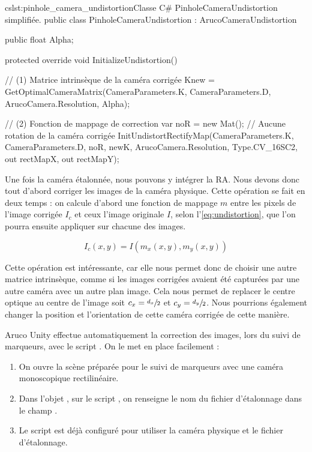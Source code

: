 \begin{listingETS}{cs}{lst:pinhole_camera_undistortion}{Classe C\# PinholeCameraUndistortion simplifiée.}
  public class PinholeCameraUndistortion : ArucoCameraUndistortion
  {
    public float Alpha;

    protected override void InitializeUndistortion()
    {
      // (1) Matrice intrinsèque de la caméra corrigée
      Knew = GetOptimalCameraMatrix(CameraParameters.K, CameraParameters.D, ArucoCamera.Resolution, Alpha);

      // (2) Fonction de mappage de correction
      var noR = new Mat(); // Aucune rotation de la caméra corrigée
      InitUndistortRectifyMap(CameraParameters.K, CameraParameters.D, noR, newK, ArucoCamera.Resolution, Type.CV_16SC2, out rectMapX, out rectMapY);
    }
  }
\end{listingETS}

Une fois la caméra étalonnée, nous pouvons y intégrer la RA. Nous devons donc tout d'abord corriger les images de la caméra physique. Cette opération se fait en deux temps : on calcule d'abord une fonction de mappage $m$ entre les pixels de l'image corrigée $I_c$ et ceux l'image originale $I$, selon l'\autoref{eq:undistortion}, que l'on pourra ensuite appliquer sur chacune des images.

\begin{equation}
  \label{eq:undistortion}
  I_c(x,y) = I(m_x(x,y), m_y(x,y))
\end{equation}

Cette opération est intéressante, car elle nous permet donc de choisir une autre matrice intrinsèque, comme si les images corrigées avaient été capturées par une autre caméra avec un autre plan image. Cela nous permet de replacer le centre optique au centre de l'image soit $c_x = \sfrac{d_x}{2}$ et $c_y = \sfrac{d_y}{2}$. Nous pourrions également changer la position et l'orientation de cette caméra corrigée de cette manière.

Aruco Unity effectue automatiquement la correction des images, lors du suivi de marqueurs, avec le script . On le met en place facilement  :
\begin{enumerate}
  \item On ouvre la scène  préparée pour le suivi de marqueurs avec une caméra monoscopique rectilinéaire.
  \item Dans l'objet , sur le script , on renseigne le nom du fichier d'étalonnage dans le champ .
  \item Le script  est déjà configuré pour utiliser la caméra physique et le fichier d'étalonnage.
\end{enumerate}
\medskip

